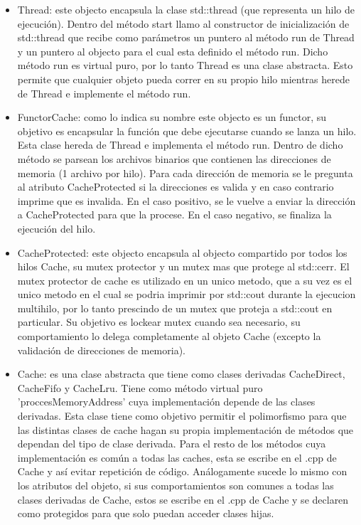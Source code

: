 \documentclass[a4paper,12pt]{report}
\begin{document}
\begin{itemize}

\item Thread: este objecto encapsula la clase std::thread (que representa un hilo de ejecuci\'on). Dentro del m\'etodo start llamo al constructor de inicializaci\'on de std::thread que recibe como par\'ametros un puntero al m\'etodo run de Thread y un puntero al objecto para el cual esta definido el m\'etodo run. Dicho m\'etodo run es virtual puro, por lo tanto Thread es una clase abstracta. Esto permite que cualquier objeto pueda correr en su propio hilo mientras herede de Thread e implemente el m\'etodo run.    

\item FunctorCache: como lo indica su nombre este objecto es un functor, su objetivo es encapsular la funci\'on que debe ejecutarse cuando se lanza un hilo. Esta clase hereda de Thread e implementa el m\'etodo run. Dentro de dicho m\'etodo se parsean los archivos binarios que contienen las direcciones de memoria (1 archivo por hilo). Para cada direcci\'on de memoria se le pregunta al atributo CacheProtected si la direcciones es valida y en caso contrario imprime que es invalida. En el caso positivo, se le vuelve a enviar la direcci\'on a CacheProtected para que la procese. En el caso negativo, se finaliza la ejecuci\'on del hilo.

\item CacheProtected: este objecto encapsula al objecto compartido por todos los hilos Cache, su mutex protector y un mutex mas que protege al std::cerr. El mutex protector de cache es utilizado en un unico metodo, que a su vez es el unico metodo en el cual se podria imprimir por std::cout durante la ejecucion multihilo, por lo tanto prescindo de un mutex que proteja a std::cout en particular. Su objetivo es lockear mutex cuando sea necesario, su comportamiento lo delega completamente al objeto Cache (excepto la validaci\'on de direcciones de memoria). 

\item Cache: es una clase abstracta que tiene como clases derivadas CacheDirect, CacheFifo y CacheLru. Tiene como m\'etodo virtual puro 'proccesMemoryAddress' cuya implementaci\'on depende de las clases derivadas. Esta clase tiene como objetivo permitir el polimorfismo para que las distintas clases de cache hagan su propia implementaci\'on de m\'etodos que dependan del tipo de clase derivada. Para el resto de los m\'etodos cuya implementaci\'on es com\'un a todas las caches, esta se escribe en el .cpp de Cache y as\'i evitar repetici\'on de c\'odigo. An\'alogamente sucede lo mismo con los atributos del objeto, si sus comportamientos son comunes a todas las clases derivadas de Cache, estos se escribe en el .cpp de Cache y se declaren como protegidos para que solo puedan acceder clases hijas.


\end{itemize}
\end{document}
